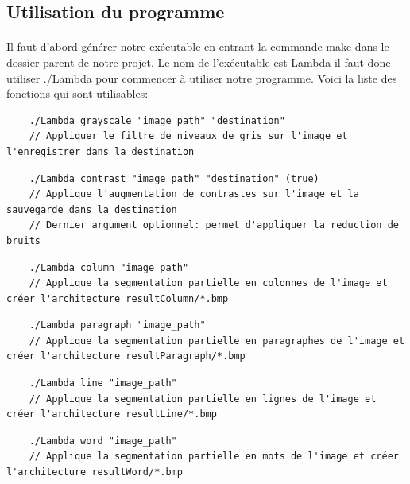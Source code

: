 \documentclass{article}
\begin{document}
\newpage
\subsection{Utilisation du programme}

\paragraph{}Il faut d'abord générer notre exécutable en entrant la commande make dans le dossier parent de notre projet. Le nom de l'exécutable est Lambda il faut donc utiliser ./Lambda pour commencer à utiliser notre programme. Voici la liste des fonctions qui sont utilisables:

\vspace*{0.5cm}

\begin{lstlisting}
	./Lambda grayscale "image_path" "destination"
	// Appliquer le filtre de niveaux de gris sur l'image et l'enregistrer dans la destination
\end{lstlisting}


\begin{lstlisting}
	./Lambda contrast "image_path" "destination" (true)
	// Applique l'augmentation de contrastes sur l'image et la sauvegarde dans la destination
	// Dernier argument optionnel: permet d'appliquer la reduction de bruits
\end{lstlisting}

\begin{lstlisting}
	./Lambda column "image_path"
	// Applique la segmentation partielle en colonnes de l'image et créer l'architecture resultColumn/*.bmp
\end{lstlisting}

\begin{lstlisting}
	./Lambda paragraph "image_path"
	// Applique la segmentation partielle en paragraphes de l'image et créer l'architecture resultParagraph/*.bmp
\end{lstlisting}

\begin{lstlisting}
	./Lambda line "image_path"
	// Applique la segmentation partielle en lignes de l'image et créer l'architecture resultLine/*.bmp
\end{lstlisting}

\begin{lstlisting}
	./Lambda word "image_path"
	// Applique la segmentation partielle en mots de l'image et créer l'architecture resultWord/*.bmp
\end{lstlisting}
\end{document}
